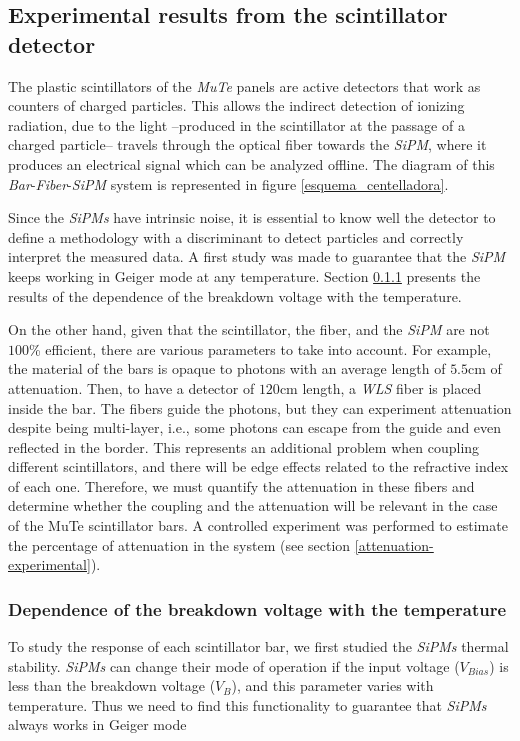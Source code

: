 \documentclass[submitting]{nst}
\begin{document}
\subsection{Experimental results from the scintillator detector}\label{sec:bar-data}%
The plastic scintillators of the \textsl{MuTe} panels are active detectors that work as counters of charged particles. This allows the indirect detection of ionizing radiation, due to the light --produced in the scintillator at the passage of a charged particle-- travels through the optical fiber towards the \textsl{SiPM}, where it produces an electrical signal which can be analyzed offline. The diagram of this \textsl{Bar}-\textsl{Fiber}-\textsl{SiPM} system is represented in figure \ref{esquema_centelladora}. 

Since the \textsl{SiPMs} have intrinsic noise,  it is essential to know well the detector to define a methodology with a discriminant to detect particles and correctly interpret the measured data. A first study was made to guarantee that the \textsl{SiPM} keeps working in Geiger mode at any temperature. Section \ref{breakdown-voltage} presents the results of the dependence of the breakdown voltage with the temperature.

On the other hand, given that the scintillator, the fiber, and the \textsl{SiPM} are not $100$\% efficient, there are various parameters to take into account. For example, the material of the bars is opaque to photons with an average length of $5.5$cm of attenuation. Then, to have a detector of $120$cm length, a \textsl{WLS} fiber is placed inside the bar. The fibers guide the photons, but they can experiment attenuation despite being multi-layer, i.e., some photons can escape from the guide and even reflected in the border. This represents an additional problem when coupling different scintillators, and there will be edge effects related to the refractive index of each one. Therefore, we must quantify the attenuation in these fibers and determine whether the coupling and the attenuation will be relevant in the case of the MuTe scintillator bars. A controlled experiment was performed to estimate the percentage of attenuation in the system (see section \ref{attenuation-experimental}).

\subsubsection{Dependence of the breakdown voltage with the temperature}\label{breakdown-voltage}
To study the response of each scintillator bar, we first studied the \textsl{SiPMs} thermal stability. \textsl{SiPMs} can change their mode of operation if the input voltage ($V_{Bias}$) is less than the breakdown voltage ($V_B$), and this parameter varies with temperature. Thus we need to find this functionality to guarantee that \textsl{SiPMs} always works in Geiger mode 
\end{document}
